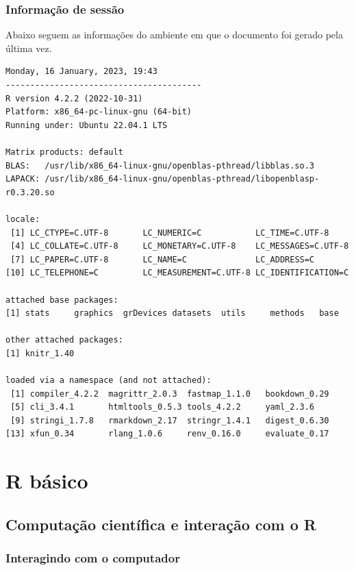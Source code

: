 \documentclass[
  10pt,
  a4paper]{book}
\begin{document}
\hypertarget{informauxe7uxe3o-de-sessuxe3o}{%
\section*{Informação de sessão}\label{informauxe7uxe3o-de-sessuxe3o}}


Abaixo seguem as informações do ambiente em que o documento foi gerado
pela última vez.

\begin{verbatim}
Monday, 16 January, 2023, 19:43
----------------------------------------
R version 4.2.2 (2022-10-31)
Platform: x86_64-pc-linux-gnu (64-bit)
Running under: Ubuntu 22.04.1 LTS

Matrix products: default
BLAS:   /usr/lib/x86_64-linux-gnu/openblas-pthread/libblas.so.3
LAPACK: /usr/lib/x86_64-linux-gnu/openblas-pthread/libopenblasp-r0.3.20.so

locale:
 [1] LC_CTYPE=C.UTF-8       LC_NUMERIC=C           LC_TIME=C.UTF-8       
 [4] LC_COLLATE=C.UTF-8     LC_MONETARY=C.UTF-8    LC_MESSAGES=C.UTF-8   
 [7] LC_PAPER=C.UTF-8       LC_NAME=C              LC_ADDRESS=C          
[10] LC_TELEPHONE=C         LC_MEASUREMENT=C.UTF-8 LC_IDENTIFICATION=C   

attached base packages:
[1] stats     graphics  grDevices datasets  utils     methods   base     

other attached packages:
[1] knitr_1.40

loaded via a namespace (and not attached):
 [1] compiler_4.2.2  magrittr_2.0.3  fastmap_1.1.0   bookdown_0.29  
 [5] cli_3.4.1       htmltools_0.5.3 tools_4.2.2     yaml_2.3.6     
 [9] stringi_1.7.8   rmarkdown_2.17  stringr_1.4.1   digest_0.6.30  
[13] xfun_0.34       rlang_1.0.6     renv_0.16.0     evaluate_0.17  
\end{verbatim}

\hypertarget{part-r-buxe1sico}{%
\part{R básico}\label{part-r-buxe1sico}}

\hypertarget{computauxe7uxe3o-cientuxedfica-e-interauxe7uxe3o-com-o-r}{%
\chapter{Computação científica e interação com o R}\label{computauxe7uxe3o-cientuxedfica-e-interauxe7uxe3o-com-o-r}}

\hypertarget{interagindo-com-o-computador}{%
\section{Interagindo com o computador}\label{interagindo-com-o-computador}}
\end{document}
